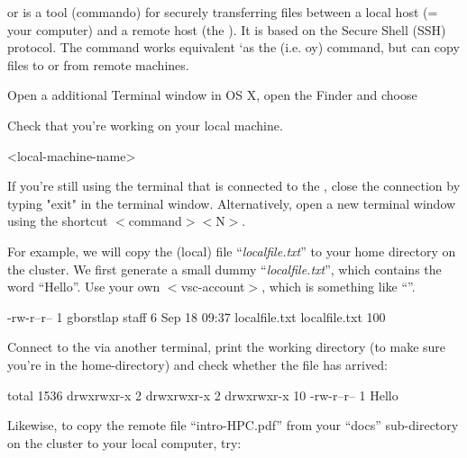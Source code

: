  or  is a tool (commando) for securely
transferring files between a local host (= your computer) and a remote host
(the \hpc). It is based on the Secure Shell (SSH) protocol.  The 
command works equivalent `as the   (i.e. oy)
command, but can copy files to or from remote machines.

Open a additional Terminal window in OS X, open the Finder and choose


Check that you're working on your local machine.

\begin{prompt}
<local-machine-name>
\end{prompt}

If you're still using the terminal that is connected to the \hpc, close the
connection by typing "exit" in the terminal window. Alternatively, open a new
terminal window using the shortcut $<$command$>$$<$N$>$.

For example, we will copy the (local) file ``\emph{localfile.txt}'' to your
home directory on the \hpc cluster. We first generate a small dummy
``\emph{localfile.txt}'', which contains the word ``Hello''.  Use your own
$<$vsc-account$>$, which is something like ``\emph{\userid}''.

\begin{prompt}
-rw-r--r-- 1 gborstlap  staff   6 Sep 18 09:37 localfile.txt
localfile.txt    100%
\end{prompt}

Connect to the \hpc via another terminal, print the working directory (to make
sure you're in the home-directory) and check whether the file has arrived:

\begin{prompt}
total 1536
drwxrwxr-x  2 %
drwxrwxr-x  2 %
drwxrwxr-x 10 %
-rw-r--r--  1 %
Hello
\end{prompt}

Likewise, to copy the remote file ``intro-HPC.pdf'' from your ``docs''
sub-directory on the cluster to your local computer, try:

